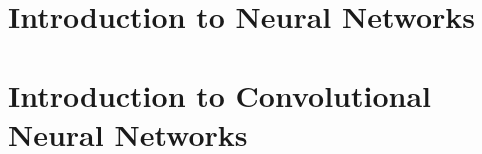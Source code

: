 \section{Introduction to Neural Networks}


\section{Introduction to Convolutional Neural Networks}


